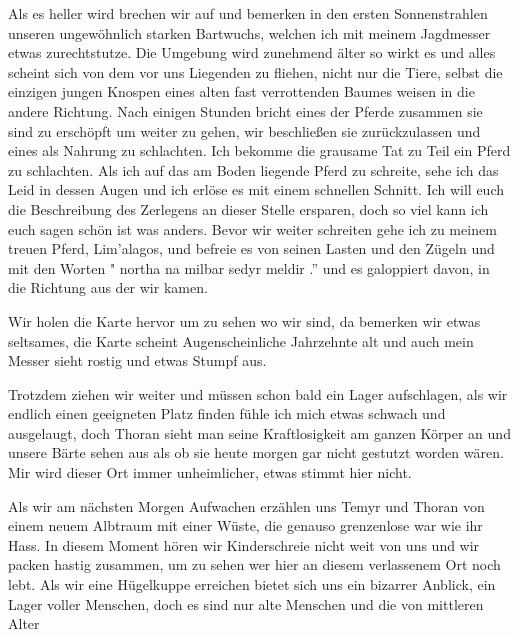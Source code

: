 Als es heller wird brechen wir auf und bemerken in den ersten Sonnenstrahlen unseren ungewöhnlich starken Bartwuchs, welchen ich mit meinem Jagdmesser etwas zurechtstutze. Die Umgebung wird zunehmend älter so wirkt es und alles scheint sich von dem vor uns Liegenden zu fliehen, nicht nur die Tiere, selbst die einzigen jungen Knospen eines alten fast verrottenden Baumes weisen in die andere Richtung. Nach einigen Stunden bricht eines der Pferde zusammen sie
sind zu erschöpft um weiter zu gehen, wir beschließen sie zurückzulassen und eines als Nahrung zu schlachten. Ich bekomme die grausame Tat zu Teil ein Pferd zu schlachten. Als ich auf das am Boden liegende Pferd zu schreite, sehe ich das Leid in dessen Augen und ich erlöse es mit einem schnellen Schnitt. Ich will euch die Beschreibung des Zerlegens an dieser Stelle ersparen, doch so viel kann ich euch sagen schön ist was anders. Bevor wir weiter schreiten gehe ich zu meinem treuen Pferd, Lim'alagos, und befreie es von seinen Lasten und den Zügeln und mit den Worten
" northa na milbar sedyr meldir .'' und es galoppiert davon, in die Richtung aus der wir kamen.\par
Wir holen die Karte hervor um zu sehen wo wir sind, da bemerken wir etwas seltsames, die Karte scheint Augenscheinliche Jahrzehnte alt und auch mein Messer sieht rostig und etwas Stumpf aus.\par
Trotzdem ziehen wir weiter und müssen schon bald ein Lager aufschlagen, als wir endlich einen geeigneten Platz finden fühle ich mich etwas schwach und ausgelaugt, doch Thoran sieht man seine Kraftlosigkeit am ganzen Körper an und unsere Bärte sehen aus als ob sie heute morgen gar nicht gestutzt worden wären. Mir wird dieser Ort immer unheimlicher, etwas stimmt hier nicht.\par
Als wir am nächsten Morgen Aufwachen erzählen uns Temyr und Thoran von einem neuem Albtraum mit einer Wüste, die genauso grenzenlose war wie ihr Hass. In diesem Moment hören wir Kinderschreie nicht weit von uns und wir packen hastig zusammen, um zu sehen wer hier an diesem verlassenem Ort noch lebt. Als wir eine Hügelkuppe erreichen bietet sich uns ein bizarrer Anblick, ein Lager voller Menschen, doch es sind nur alte Menschen und die von mittleren Alter

